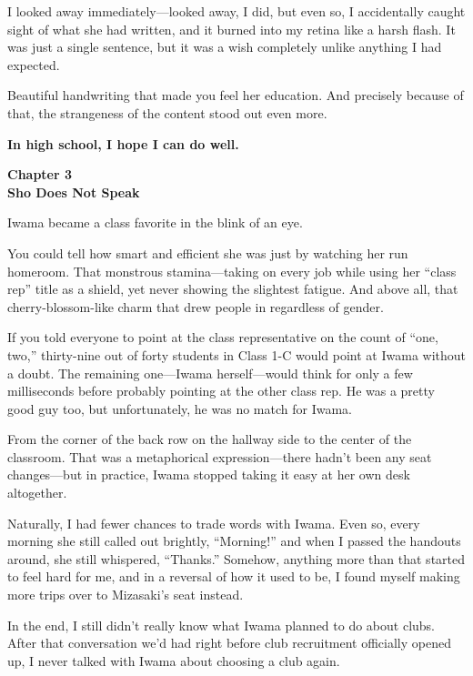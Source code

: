 \documentclass[
    a4paper,
    12pt,
    twoside,
    openany,
    UTF8,
    fontset=windows
]{ctexbook}
\begin{document}
I looked away immediately---looked away, I did, but even so, I accidentally caught sight of what she had written, and it burned into my retina like a harsh flash. It was just a single sentence, but it was a wish completely unlike anything I had expected.

Beautiful handwriting that made you feel her education. And precisely because of that, the strangeness of the content stood out even more.

\textbf{In high school, I hope I can do well.}

\clearpage
\thispagestyle{plain}
\begin{center}
    \large\bfseries
    Chapter 3\\
    Sho Does Not Speak
\end{center}
\label{sec:ch3}
\vspace{1cm}

Iwama became a class favorite in the blink of an eye.

You could tell how smart and efficient she was just by watching her run homeroom. That monstrous stamina---taking on every job while using her ``class rep'' title as a shield, yet never showing the slightest fatigue. And above all, that cherry-blossom-like charm that drew people in regardless of gender.

If you told everyone to point at the class representative on the count of ``one, two,'' thirty-nine out of forty students in Class 1-C would point at Iwama without a doubt. The remaining one---Iwama herself---would think for only a few milliseconds before probably pointing at the other class rep. He was a pretty good guy too, but unfortunately, he was no match for Iwama.

From the corner of the back row on the hallway side to the center of the classroom. That was a metaphorical expression---there hadn't been any seat changes---but in practice, Iwama stopped taking it easy at her own desk altogether.

Naturally, I had fewer chances to trade words with Iwama. Even so, every morning she still called out brightly, ``Morning!'' and when I passed the handouts around, she still whispered, ``Thanks.'' Somehow, anything more than that started to feel hard for me, and in a reversal of how it used to be, I found myself making more trips over to Mizasaki's seat instead.

In the end, I still didn't really know what Iwama planned to do about clubs. After that conversation we'd had right before club recruitment officially opened up, I never talked with Iwama about choosing a club again.
\end{document}
